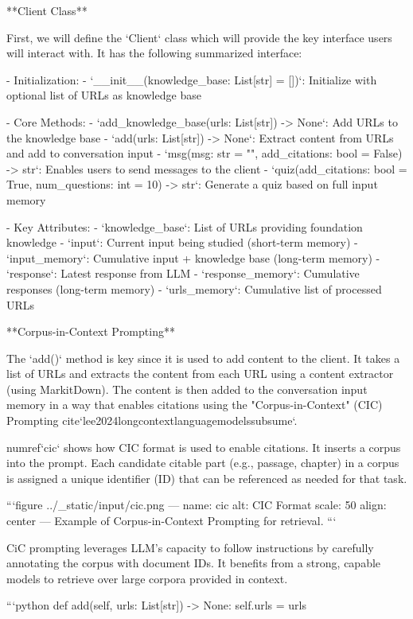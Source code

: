 {{**Client Class**

First, we will define the `Client` class which will provide the key interface users will interact with. It has the following summarized interface:

- Initialization:
    - `__init__(knowledge_base: List[str] = [])`: Initialize with optional list of URLs as knowledge base

- Core Methods:
    - `add_knowledge_base(urls: List[str]) -> None`: Add URLs to the knowledge base
    - `add(urls: List[str]) -> None`: Extract content from URLs and add to conversation input
    - `msg(msg: str = "", add_citations: bool = False) -> str`: Enables users to send messages to the client
    - `quiz(add_citations: bool = True, num_questions: int = 10) -> str`: Generate a quiz based on full input memory

- Key Attributes:
    - `knowledge_base`: List of URLs providing foundation knowledge
    - `input`: Current input being studied (short-term memory)
    - `input_memory`: Cumulative input + knowledge base (long-term memory) 
    - `response`: Latest response from LLM
    - `response_memory`: Cumulative responses (long-term memory)
    - `urls_memory`: Cumulative list of processed URLs


**Corpus-in-Context Prompting**

The `add()` method is key since it is used to add content to the client. It takes a list of URLs and extracts the content from each URL using a content extractor (using MarkitDown). The content is then added to the conversation input memory in a way that enables citations using the "Corpus-in-Context" (CIC) Prompting {cite}`lee2024longcontextlanguagemodelssubsume`.

{numref}`cic` shows how CIC format is used to enable citations. It inserts a corpus into the prompt. Each candidate citable part (e.g., passage, chapter) in a corpus is assigned a unique identifier (ID) that can be referenced as needed for that task.

```{figure} ../_static/input/cic.png
---
name: cic
alt: CIC Format
scale: 50%
align: center
---
Example of Corpus-in-Context Prompting for retrieval. 
```

CiC prompting leverages LLM's capacity to follow instructions by carefully annotating the corpus with document IDs. It benefits from a strong, capable models to retrieve over large corpora provided in context. 

```python
    def add(self, urls: List[str]) -> None:
        self.urls = urls

}}
